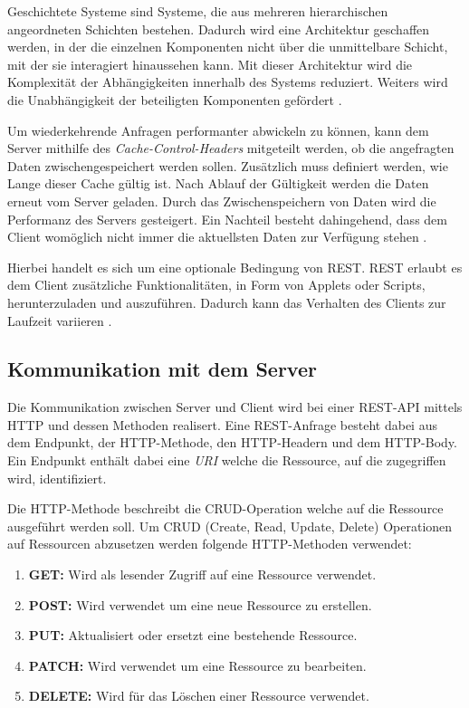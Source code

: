 Geschichtete Systeme sind Systeme, die aus mehreren hierarchischen angeordneten Schichten bestehen.
Dadurch wird eine Architektur geschaffen werden, in der die einzelnen Komponenten nicht über die unmittelbare Schicht, mit der sie interagiert hinaussehen kann.
Mit dieser Architektur wird die Komplexität der Abhängigkeiten innerhalb des Systems reduziert.
Weiters wird die Unabhängigkeit der beteiligten Komponenten gefördert \cite[S. 79]{fielding2000architectural}.

Um wiederkehrende Anfragen performanter abwickeln zu können, kann dem Server mithilfe des \textit{Cache-Control-Headers} mitgeteilt werden, ob die angefragten Daten zwischengespeichert werden sollen.
Zusätzlich muss definiert werden, wie Lange dieser Cache gültig ist.
Nach Ablauf der Gültigkeit werden die Daten erneut vom Server geladen.
Durch das Zwischenspeichern von Daten wird die Performanz des Servers gesteigert.
Ein Nachteil besteht dahingehend, dass dem Client womöglich nicht immer die aktuellsten Daten zur Verfügung stehen \cite[S. 79]{fielding2000architectural}.

Hierbei handelt es sich um eine optionale Bedingung von REST.
REST erlaubt es dem Client zusätzliche Funktionalitäten, in Form von Applets oder Scripts, herunterzuladen und auszuführen.
Dadurch kann das Verhalten des Clients zur Laufzeit variieren \cite[S. 84]{fielding2000architectural}.

\subsection{Kommunikation mit dem Server}
Die Kommunikation zwischen Server und Client wird bei einer REST-API mittels HTTP und dessen Methoden realisert.
Eine REST-Anfrage besteht dabei aus dem Endpunkt, der HTTP-Methode, den HTTP-Headern und dem HTTP-Body.
Ein Endpunkt enthält dabei eine \textit{URI} welche die Ressource, auf die zugegriffen wird, identifiziert.
\newline

Die HTTP-Methode beschreibt die CRUD-Operation welche auf die Ressource ausgeführt werden soll.
Um CRUD (Create, Read, Update, Delete) Operationen auf Ressourcen abzusetzen werden folgende HTTP-Methoden verwendet:
\begin{enumerate}
    \item \textbf{GET: }Wird als lesender Zugriff auf eine Ressource verwendet.
    \item \textbf{POST: }Wird verwendet um eine neue Ressource zu erstellen.
    \item \textbf{PUT: }Aktualisiert oder ersetzt eine bestehende Ressource.
    \item \textbf{PATCH: }Wird verwendet um eine Ressource zu bearbeiten.
    \item \textbf{DELETE: }Wird für das Löschen einer Ressource verwendet.
\end{enumerate}

